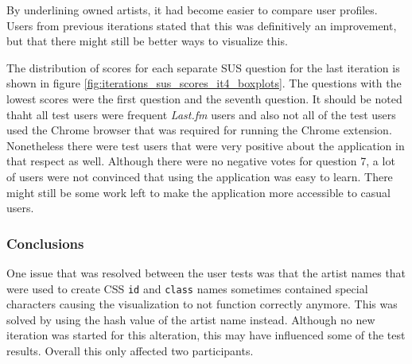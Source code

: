By underlining owned artists, it had become easier to compare user profiles. Users from previous iterations stated that this was definitively an improvement, but that there might still be better ways to visualize this. %

The distribution of scores for each separate SUS question for the last iteration is shown in figure \ref{fig:iterations_sus_scores_it4_boxplots}. The questions with the lowest scores were the first question and the seventh question. It should be noted thaht all test users were frequent \emph{Last.fm} users and also not all of the test users used the Chrome browser that was required for running the Chrome extension. Nonetheless there were test users that were very positive about the application in that respect as well. Although there were no negative votes for question 7, a lot of users were not convinced that using the application was easy to learn. There might still be some work left to make the application more accessible to casual users.












\subsubsection{Conclusions}\label{chapter:prototype:section:soundsuggest3:conclusion}

One issue that was resolved between the user tests was that the artist names that were used to create CSS \texttt{id} and \texttt{class} names sometimes contained special characters causing the visualization to not function correctly anymore. This was solved by using the hash value of the artist name instead. Although no new iteration was started for this alteration, this may have influenced some of the test results. Overall this only affected two participants.

